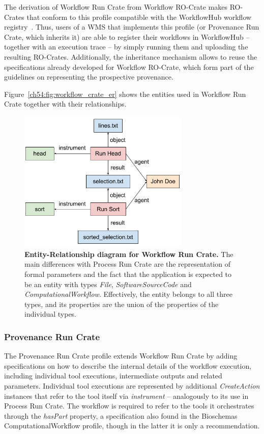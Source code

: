 The derivation of Workflow Run Crate from Workflow RO-Crate makes RO-Crates that conform to this profile compatible with the WorkflowHub workflow registry~\cite{Goble 2021}.
Thus, users of a WMS that implements this profile (or Provenance Run Crate, which inherits it) are able to register their workflows in WorkflowHub -- together with an execution trace -- by simply running them and uploading the resulting RO-Crates.
Additionally, the inheritance mechanism allows to reuse the specifications already developed for Workflow RO-Crate, which form part of the guidelines on representing the prospective provenance.

Figure~\vref{ch54:fig:workflow_crate_er} shows the entities used in Workflow Run Crate together with their relationships.

\begin{figure}[!h]
\includegraphics[width=22em]{figures/ch54/image3.png}
\caption{{\bf Entity-Relationship diagram for Workflow Run Crate.}
The main differences with Process Run Crate are the representation of formal parameters and the fact that the application is expected to be an entity with types \emph{File}, \emph{SoftwareSourceCode} and \emph{ComputationalWorkflow}.
Effectively, the entity belongs to all three types, and its properties are the union of the properties of the individual types.
}
\label{ch54:fig:workflow_crate_er}
\end{figure}


\subsubsection{Provenance Run Crate}\label{ch54:provenance-run-crate}

The Provenance Run Crate profile extends Workflow Run Crate by adding specifications on how to describe the internal details of the workflow execution, including individual tool executions, intermediate outputs and related parameters.
Individual tool executions are represented by additional \emph{CreateAction} instances that refer to the tool itself via \emph{instrument} -- analogously to its use in Process Run Crate.
The workflow is required to refer to the tools it orchestrates through the \emph{hasPart} property, a specification also found in the Bioschemas ComputationalWorkflow profile, though in the latter it is only a recommendation.

